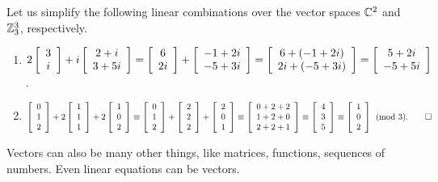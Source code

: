 \begin{Exam} Let us simplify the following linear combinations over the vector spaces $\C^2$ and $\Z_3^3$, respectively.
\begin{enumerate}
\item $2\mtx{c}{3\\ i} + i\mtx{c}{2+i\\ 3+5i} = \mtx{c}{6\\2i} + \mtx{c}{-1+2i\\ -5+3i} = \mtx{c}{6+(-1+2i)\\ 2i + (-5+3i)} = \mtx{c}{5+2i\\-5+5i}$.\\

\item $\vr{0\\1\\2} + 2\vr{1\\1\\1} + 2\vr{1\\0\\2} \equiv \vr{0\\1\\2} + \vr{2\\2\\2} + \vr{2\\0\\1} \equiv \mtx{c}{0+2+2\\ 1+2+0\\2+2+1} \equiv \mtx{c}{4\\3\\5} \equiv \mtx{c}{1\\0\\2} \pmod 3. \hfill\qedhere$
\end{enumerate}
\end{Exam}\vs

Vectors can also be many other things, like matrices,  functions, sequences of numbers. Even linear equations can be vectors. \\

